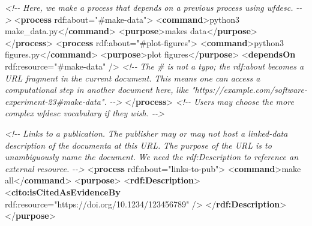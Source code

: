 \documentclass[manuscript,authordraft]{acmart}
\newenvironment{Shaded}{}{}
\newcommand{\CommentTok}[1]{\textcolor[rgb]{0.38,0.63,0.69}{\textit{#1}}}
\newcommand{\KeywordTok}[1]{\textcolor[rgb]{0.00,0.44,0.13}{\textbf{#1}}}
\newcommand{\NormalTok}[1]{#1}
\newcommand{\OtherTok}[1]{\textcolor[rgb]{0.00,0.44,0.13}{#1}}
\newcommand{\StringTok}[1]{\textcolor[rgb]{0.25,0.44,0.63}{#1}}
\begin{document}
\begin{Shaded}
\begin{Highlighting}[]
  \CommentTok{\textless{}!{-}{-}}
\CommentTok{  Here, we make a process that depends on a previous process using wfdesc.}
\CommentTok{  {-}{-}\textgreater{}}
\NormalTok{  \textless{}}\KeywordTok{process}\OtherTok{ rdf:about=}\StringTok{"\#make{-}data"}\NormalTok{\textgreater{}}
\NormalTok{    \textless{}}\KeywordTok{command}\NormalTok{\textgreater{}python3 make\_data.py\textless{}/}\KeywordTok{command}\NormalTok{\textgreater{}}
\NormalTok{    \textless{}}\KeywordTok{purpose}\NormalTok{\textgreater{}makes data\textless{}/}\KeywordTok{purpose}\NormalTok{\textgreater{}}
\NormalTok{  \textless{}/}\KeywordTok{process}\NormalTok{\textgreater{}}
\NormalTok{  \textless{}}\KeywordTok{process}\OtherTok{ rdf:about=}\StringTok{"\#plot{-}figures"}\NormalTok{\textgreater{}}
\NormalTok{    \textless{}}\KeywordTok{command}\NormalTok{\textgreater{}python3 figures.py\textless{}/}\KeywordTok{command}\NormalTok{\textgreater{}}
\NormalTok{    \textless{}}\KeywordTok{purpose}\NormalTok{\textgreater{}plot figures\textless{}/}\KeywordTok{purpose}\NormalTok{\textgreater{}}
\NormalTok{    \textless{}}\KeywordTok{dependsOn}\OtherTok{ rdf:resource=}\StringTok{"\#make{-}data"}\NormalTok{ /\textgreater{}}
    \CommentTok{\textless{}!{-}{-}}
\CommentTok{    The \# is not a typo; the rdf:about becomes a URL fragment in the current document.}
\CommentTok{    This means one can access a computational step in another document here,}
\CommentTok{    like "https://example.com/software{-}experiment{-}23\#make{-}data".}
\CommentTok{    {-}{-}\textgreater{}}
\NormalTok{  \textless{}/}\KeywordTok{process}\NormalTok{\textgreater{}}
  \CommentTok{\textless{}!{-}{-} Users may choose the more complex wfdesc vocabulary if they wish. {-}{-}\textgreater{}}

  \CommentTok{\textless{}!{-}{-}}
\CommentTok{  Links to a publication.}
\CommentTok{  The publisher may or may not host a linked{-}data description of the documenta at this URL.}
\CommentTok{  The purpose of the URL is to unambiguously name the document.}
\CommentTok{  We need the rdf:Description to reference an external resource.}
\CommentTok{  {-}{-}\textgreater{}}
\NormalTok{  \textless{}}\KeywordTok{process}\OtherTok{ rdf:about=}\StringTok{"links{-}to{-}pub"}\NormalTok{\textgreater{}}
\NormalTok{    \textless{}}\KeywordTok{command}\NormalTok{\textgreater{}make all\textless{}/}\KeywordTok{command}\NormalTok{\textgreater{}}
\NormalTok{    \textless{}}\KeywordTok{purpose}\NormalTok{\textgreater{}}
\NormalTok{      \textless{}}\KeywordTok{rdf:Description}\NormalTok{\textgreater{}}
\NormalTok{        \textless{}}\KeywordTok{cito:isCitedAsEvidenceBy}\OtherTok{ rdf:resource=}\StringTok{"https://doi.org/10.1234/123456789"}\NormalTok{ /\textgreater{}}
\NormalTok{      \textless{}/}\KeywordTok{rdf:Description}\NormalTok{\textgreater{}}
\NormalTok{    \textless{}/}\KeywordTok{purpose}\NormalTok{\textgreater{}}


\end{Highlighting}
\end{Shaded}
\end{document}
